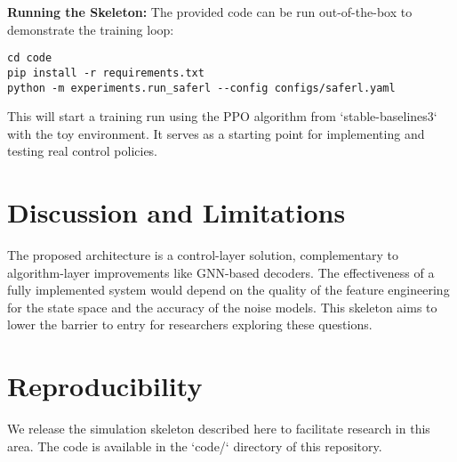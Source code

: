 \documentclass[conference]{IEEEtran}
\begin{document}
\textbf{Running the Skeleton:} The provided code can be run out-of-the-box to demonstrate the training loop:
\begin{verbatim}
cd code
pip install -r requirements.txt
python -m experiments.run_saferl --config configs/saferl.yaml
\end{verbatim}
This will start a training run using the PPO algorithm from `stable-baselines3` with the toy environment. It serves as a starting point for implementing and testing real control policies.

\section{Discussion and Limitations}
The proposed architecture is a control-layer solution, complementary to algorithm-layer improvements like GNN-based decoders. The effectiveness of a fully implemented system would depend on the quality of the feature engineering for the state space and the accuracy of the noise models. This skeleton aims to lower the barrier to entry for researchers exploring these questions.

\section{Reproducibility}
We release the simulation skeleton described here to facilitate research in this area. The code is available in the `code/` directory of this repository.



\end{document}
